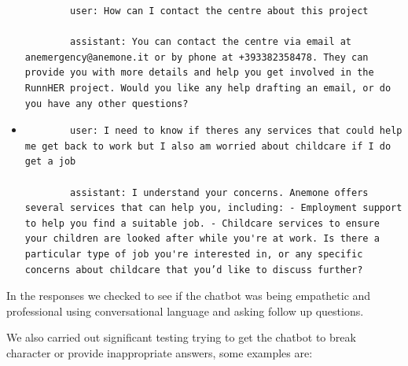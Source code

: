 \begin{itemize}
\begin{verbatim}
        user: How can I contact the centre about this project

        assistant: You can contact the centre via email at anemergency@anemone.it or by phone at +393382358478. They can provide you with more details and help you get involved in the RunnHER project. Would you like any help drafting an email, or do you have any other questions?
    \end{verbatim}

	\item
	\begin{verbatim}
        user: I need to know if theres any services that could help me get back to work but I also am worried about childcare if I do get a job

        assistant: I understand your concerns. Anemone offers several services that can help you, including: - Employment support to help you find a suitable job. - Childcare services to ensure your children are looked after while you're at work. Is there a particular type of job you're interested in, or any specific concerns about childcare that you’d like to discuss further?
	\end{verbatim}


\end{itemize}

In the responses we checked to see if the chatbot was being empathetic and professional using conversational language and asking follow up questions. 

We also carried out significant testing trying to get the chatbot to break character or provide inappropriate answers, some examples are: 

